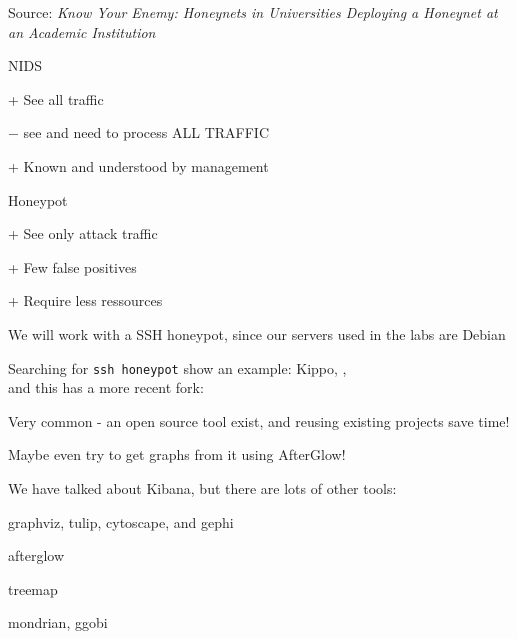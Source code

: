 \documentclass[Screen16to9,17pt]{foils}
\begin{document}
Source: \emph{Know Your Enemy: Honeynets in Universities Deploying a Honeynet at an Academic Institution}



\begin{list1}
\item NIDS
\begin{list2}
\item + See all traffic
\item $-$ see and need to process ALL TRAFFIC
\item + Known and understood by management
\end{list2}
\item Honeypot
\begin{list2}
\item + See only attack traffic
\item + Few false positives
\item + Require less ressources
\end{list2}
\end{list1}


We will work with a SSH honeypot, since our servers used in the labs are Debian

Searching for \verb+ssh honeypot+  show an example: Kippo,
,\\
and this has a more recent fork: 

Very common - an open source tool exist, and reusing existing projects save time!

Maybe even try to get graphs from it using AfterGlow!\\




We have talked about Kibana, but there are lots of other tools:

\begin{list2}
\item graphviz, tulip, cytoscape, and gephi
\item afterglow \\
\item treemap
\item mondrian, ggobi
\end{list2}
\end{document}
